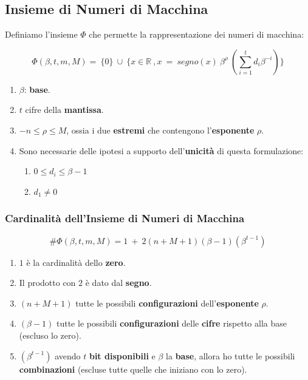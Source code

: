 \documentclass{article}
\begin{document}
\vspace*{10px}

\subsection{Insieme di Numeri di Macchina}

Definiamo l'insieme $\Phi$ che permette la rappresentazione dei numeri di macchina:

\[ \Phi(\beta, t, m,M) = \: \{0\} \: \cup \: \{ x \in \mathbb{R} \: , x \: = \: segno(x) \: \beta^{\rho} \: (\sum^{t}_{i=1} d_{i}\beta^{-i} ) \} \]

\begin{enumerate}
    \item $\beta$: \textbf{base}.
    \item $t$ cifre della \textbf{mantissa}.
    \item $-n\leq \rho \leq M$, ossia i due \textbf{estremi} che contengono l'\textbf{esponente} $\rho$.
    \item Sono necessarie delle ipotesi a supporto dell'\textbf{unicità} di questa formulazione:
    \begin{enumerate}
        \item $0 \leq d_{i} \leq \beta-1$
        \item $d_{1} \neq 0$
    \end{enumerate}
\end{enumerate}

\newpage

\subsubsection{Cardinalità dell'Insieme di Numeri di Macchina}

\[ \# \Phi (\beta, t, m,M) = 1 \: + \: 2 (n+M+1)(\beta-1)(\beta^{t-1}) \]

\begin{enumerate}
    \item $1$ è la cardinalità dello \textbf{zero}.
    \item Il prodotto con $2$ è dato dal \textbf{segno}.
    \item $(n+M+1)$ tutte le possibili \textbf{configurazioni} dell'\textbf{esponente} $\rho$.
    \item $(\beta-1)$ tutte le possibili \textbf{configurazioni} delle \textbf{cifre} rispetto alla base (escluso lo zero).
    \item $(\beta^{t-1})$ avendo $t$ \textbf{bit disponibili} e $\beta$ la \textbf{base}, allora ho tutte le possibili \textbf{combinazioni} (escluse tutte quelle che iniziano con lo zero).
\end{enumerate}
\end{document}
